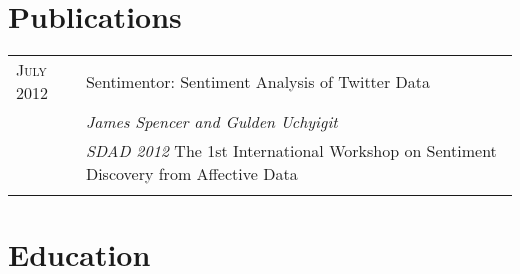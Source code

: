 \documentclass[a4paper,10pt]{article} %
\begin{document}

\section{Publications}

\begin{tabular}{ L{2cm} | L{11cm}}	
\textsc{July} 2012 & Sentimentor: Sentiment Analysis of Twitter Data\\
& \small\emph{James Spencer and Gulden Uchyigit} \\
& \small\emph{SDAD 2012  } The 1st International Workshop on Sentiment Discovery from Affective Data\\



&\\
\end{tabular}



\section{Education}
\end{document}

